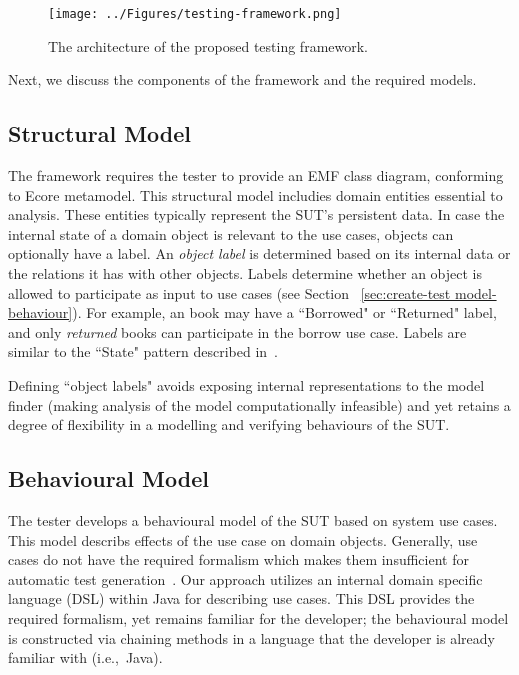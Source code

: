\begin{figure*}[ht]
\centering
\texttt{[image: ../Figures/testing-framework.png]}
\caption{The architecture of the proposed testing framework.}
\label{fig:testing-framework}
\end{figure*}

Next, we discuss the components of the framework and the required models. 

\subsection{Structural Model}
\label{sec:framework-overview-structure}
The framework requires the tester to provide an EMF class diagram, conforming to Ecore metamodel.
This structural model includies domain entities essential to analysis. These entities typically represent the SUT's persistent data. 
In case the internal state of a domain object is relevant to the use cases, objects can optionally have a label.
An \textit{object label} is determined based on its internal data or the relations it has with other objects.
Labels determine whether an object is allowed to participate as input to use cases (see Section ~\ref{sec:create-test model-behaviour}). For example, an book may have a ``Borrowed" or ``Returned" label, and only \textit{returned} books can participate in the borrow  use case. Labels are similar to the ``State" pattern described in~\cite{Gamma1995}. 

Defining ``object labels" avoids exposing internal representations to the model finder (making analysis of the model computationally infeasible) and yet retains a degree of flexibility in a modelling and verifying behaviours of the SUT.

\subsection{Behavioural Model}
\label{sec:framework-overview-behaviour}
The tester develops a behavioural model of the SUT based on system use cases. This model describs effects of the use case on domain objects. Generally, use cases do not have the required formalism which makes them insufficient for automatic test generation~\cite{}. Our approach utilizes an internal domain specific language (DSL) within Java for describing use cases. This DSL provides the required formalism, yet remains familiar for the developer;  the behavioural model is constructed via chaining methods in a language that the developer is already familiar with (i.e.,\ Java).

